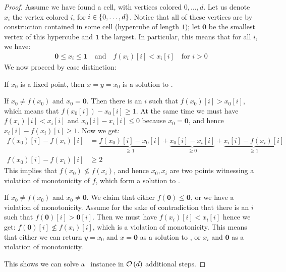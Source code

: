 \begin{proof}
	Assume we have found a cell, with vertices colored $0, \dots, d$. Let us denote $x_i$ the vertex colored $i$, for $i \in \left\{0, \dots, d\right\}$. Notice that all of these vertices are by construction contained in some cell (hypercube of length $1$); let $\mathbf{0}$ be the smallest vertex of this hypercube and $\mathbf{1}$ the largest. In particular, this means that for all $i$, we have:
	\begin{align*}
		\mathbf{0} \leq x_i \leq \mathbf{1} \quad \text{and} \quad f(x_i)[i] < x_i[i] \quad \text{for $i > 0$}
	\end{align*}
	We now proceed by case distinction:
	\begin{case}{1}
		If $x_0$ is a fixed point, then $x = y = x_0$ is a solution to \Tarskistar.
	\end{case}
	\begin{case}{2}
		If $x_0 \neq f(x_0)$ and $x_0 = \mathbf{0}$. Then there is an $i$ such that $f(x_0)[i] > x_0[i]$, which means that $f(x_0[i]) - x_0[i] \geq 1$. At the same time we must have $f(x_i)[i] < x_i[i]$ and $x_0[i] - x_i[i] \leq 0$ because $x_0 = \mathbf{0}$, and hence $x_i[i] - f(x_i)[i] \geq 1$. Now we get:
		\begin{align*}
			f(x_0)[i] - f(x_i)[i] & = \underbrace{f(x_0)[i] - x_0[i]}_{\geq 1} + \underbrace{x_0[i] - x_i[i]}_{\geq 0} + \underbrace{x_i[i] - f(x_i)[i]}_{\geq 1} \\
			f(x_0)[i] - f(x_i)[i] & \geq 2
		\end{align*}
		This implies that $f(x_0) \not \leq f(x_i)$, and hence $x_0, x_i$ are two points witnessing a violation of monotonicity of $f$, which form a solution to \Tarskistar.
	\end{case}
	\begin{case}{3}
		If $x_0 \neq f(x_0)$ and $x_0 \neq \mathbf{0}$. We claim that either $f(\mathbf{0}) \leq \mathbf{0}$, or we have a violation of monotonicity. Assume for the sake of contradiction that there is an $i$ such that $f(\mathbf{0})[i] > \mathbf{0}[i]$. Then we must have $f(x_i)[i] < x_i[i]$ hence we get: $f(\mathbf{0})[i] \not\leq f(x_i)[i]$, which is a violation of monotonicity. This means that either we can return $y = x_0$ and $x = \mathbf{0}$ as a solution to \Tarskistar, or $x_i$ and $\mathbf{0}$ as a violation of monotonicity.
	\end{case}
	This shows we can solve a \Tarskistar\ instance in $\mathcal{O}\left(d\right)$ additional steps.
\end{proof}

